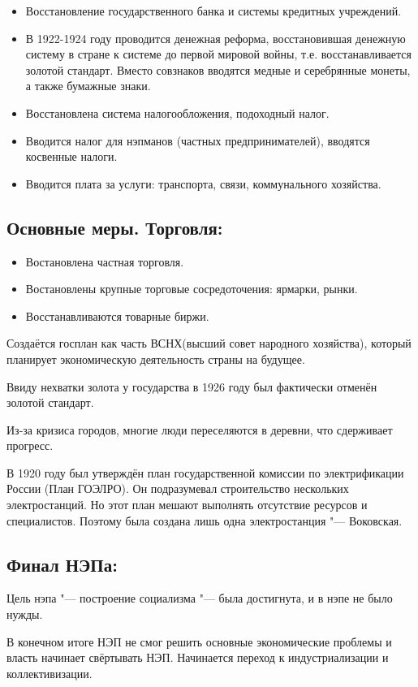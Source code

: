 \begin{itemize}
    \item Восстановление государственного банка и системы кредитных учреждений.
    \item В 1922-1924 году проводится денежная реформа, восстановившая денежную систему в стране к системе до первой мировой войны, т.е. восстанавливается золотой стандарт. Вместо совзнаков вводятся медные и серебрянные монеты, а также бумажные знаки.
    \item Восстановлена система налогообложения, подоходный налог.
    \item Вводится налог для нэпманов (частных предпринимателей), вводятся косвенные налоги.
    \item Вводится плата за услуги: транспорта, связи, коммунального хозяйства.
\end{itemize}

\subsection{Основные меры. Торговля:}

\begin{itemize}
    \item Востановлена частная торговля.
    \item Востановлены крупные торговые сосредоточения: ярмарки, рынки. 
    \item Восстанавливаются товарные биржи.
\end{itemize}

\vspace{0.5cm}

Создаётся госплан как часть ВСНХ(высший совет народного хозяйства), который планирует экономическую деятельность страны на будущее. 

Ввиду нехватки золота у государства в 1926 году был фактически отменён золотой стандарт.

Из-за кризиса городов, многие люди переселяются в деревни, что сдерживает прогресс.

В 1920 году был утверждён план государственной комиссии по электрификации России (План ГОЭЛРО). Он подразумевал строительство нескольких электростанций. Но этот план мешают выполнять отсутствие ресурсов и специалистов. Поэтому была создана лишь одна электростанция "--- Воковская.

\subsection{Финал НЭПа:}

Цель нэпа "--- построение социализма "--- была достигнута, и в нэпе не было нужды.

В конечном итоге НЭП не смог решить основные экономические проблемы и власть начинает свёртывать НЭП. Начинается переход к индустриализации и коллективизации.


